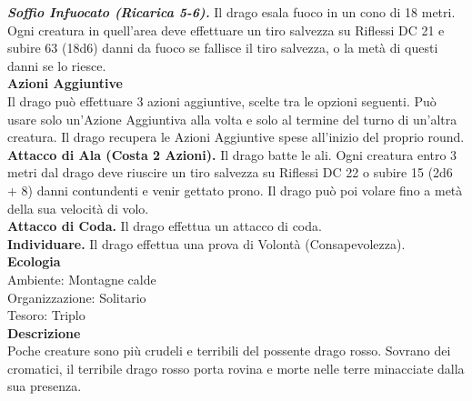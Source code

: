 \begin{multicols}{2}
\emph{\textbf{Soffio Infuocato (Ricarica 5-6).}} Il drago esala fuoco in  un cono di 18 metri. Ogni creatura in quell'area deve effettuare un tiro salvezza su Riflessi DC 21 e subire 63 (18d6) danni da fuoco se fallisce il tiro salvezza, o la metà di questi danni se lo riesce.\\
\textbf{Azioni Aggiuntive}\\
Il drago può effettuare 3 azioni aggiuntive, scelte tra le opzioni seguenti. Può usare solo un'Azione Aggiuntiva alla volta e solo al termine del turno di un'altra creatura. Il drago recupera le Azioni Aggiuntive spese all'inizio del proprio round.\\
\textbf{Attacco di Ala (Costa 2 Azioni).} Il drago batte le ali. Ogni creatura entro 3 metri dal drago deve riuscire un tiro salvezza su Riflessi DC 22 o subire 15 (2d6 + 8) danni contundenti e venir gettato prono. Il drago può poi volare fino a metà della sua velocità di volo.\\
\textbf{Attacco di Coda.} Il drago effettua un attacco di coda.\\
\textbf{Individuare.} Il drago effettua una prova di Volontà (Consapevolezza).\\
\textbf{Ecologia}\\
Ambiente: Montagne calde\\
Organizzazione: Solitario\\
Tesoro: Triplo\\
\textbf{Descrizione}\\
Poche creature sono più crudeli e terribili del possente drago rosso. Sovrano dei cromatici, il terribile drago rosso porta rovina e morte nelle terre minacciate dalla sua presenza.\\


\end{multicols}
